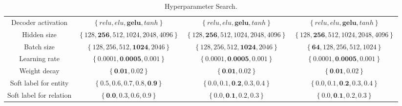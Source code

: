 \documentclass[11pt]{article}
\begin{document}
\begin{table*}[h!t]
\begin{tabular}{rrrr}
\multicolumn{1}{c}{Decoder activation} & \multicolumn{1}{c}{$\left\{relu, elu, \textbf{gelu}, tanh\right\}$}& \multicolumn{1}{c}{$\left\{relu, elu, \textbf{gelu}, tanh\right\}$}& \multicolumn{1}{c}{$\left\{relu, elu, \textbf{gelu}, tanh\right\}$}\\
\multicolumn{1}{c}{Hidden size} & \multicolumn{1}{c}{$\left\{128, \textbf{256}, 512, 1024, 2048, 4096\right\}$}& \multicolumn{1}{c}{$\left\{128, \textbf{256}, 512, 1024, 2048, 4096\right\}$}& \multicolumn{1}{c}{$\left\{128, \textbf{256}, 512, 1024, 2048, 4096\right\}$}\\
\multicolumn{1}{c}{Batch size} & \multicolumn{1}{c}{$\left\{128, 256, 512, \textbf{1024}, 2046\right\}$}& \multicolumn{1}{c}{$\left\{128, 256, 512, \textbf{1024}, 2046\right\}$}& \multicolumn{1}{c}{$\left\{\textbf{64}, 128, 256, 512, 1024\right\}$}\\
\multicolumn{1}{c}{Learning rate} & \multicolumn{1}{c}{$\left\{0.0001, \textbf{0.0005}, 0.001\right\}$}& \multicolumn{1}{c}{$\left\{0.0001, \textbf{0.0005}, 0.001\right\}$}& \multicolumn{1}{c}{$\left\{0.0001, \textbf{0.0005}, 0.001\right\}$}\\
\multicolumn{1}{c}{Weight decay} & \multicolumn{1}{c}{$\left\{\textbf{0.01}, 0.02\right\}$}& \multicolumn{1}{c}{$\left\{\textbf{0.01}, 0.02\right\}$}& \multicolumn{1}{c}{$\left\{\textbf{0.01}, 0.02\right\}$}\\
\multicolumn{1}{c}{Soft label for entity} & \multicolumn{1}{c}{$\left\{0.5, 0.6, 0.7, 0.8, \textbf{0.9}\right\}$}& \multicolumn{1}{c}{$\left\{0.0, 0.1, \textbf{0.2}, 0.3, 0.4\right\}$}& \multicolumn{1}{c}{$\left\{0.0, 0.1, \textbf{0.2}, 0.3, 0.4\right\}$}\\
\multicolumn{1}{c}{Soft label for relation} & \multicolumn{1}{c}{$\left\{\textbf{0.0}, 0.3, 0.6, 0.9\right\}$}& \multicolumn{1}{c}{$\left\{0.0, \textbf{0.1}, 0.2, 0.3\right\}$}& \multicolumn{1}{c}{$\left\{0.0, \textbf{0.1}, 0.2, 0.3\right\}$}\\
\bottomrule   
\end{tabular}

\caption{\label{t6}
Hyperparameter Search.
}

\end{table*}
\end{document}
